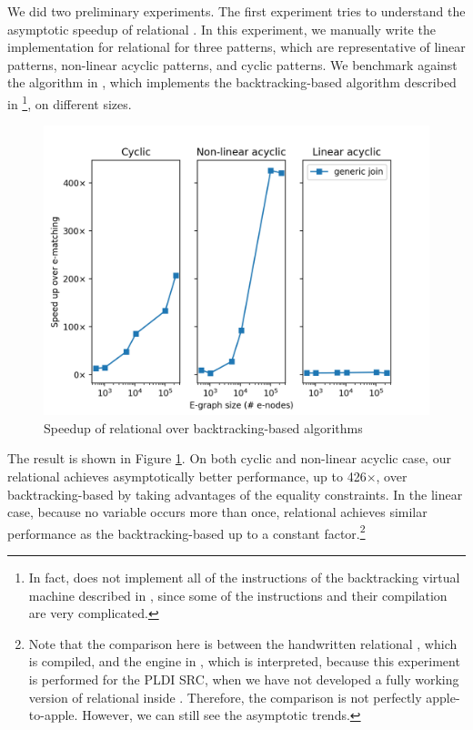 We did two preliminary experiments. The first experiment tries to understand the asymptotic speedup of relational \ematching. In this experiment, we manually write the implementation for relational \ematching for three patterns, which are representative of linear patterns, non-linear acyclic patterns, and cyclic patterns. We benchmark against the \ematching algorithm in \egg, which implements the backtracking-based \ematching algorithm described in \citet{efficient-ematching}\footnote{In fact, \egg does not implement all of the instructions of the backtracking virtual machine described in \citet{efficient-ematching}, since some of the instructions and their compilation are very complicated.}, on different \egraph sizes.

\begin{figure}
    \centering
    \includegraphics[width=\linewidth]{figures/egdb.png}
    \caption{Speedup of relational \ematching over backtracking-based \ematching algorithms}
    \label{fig:bench1}
\end{figure}

The result is shown in Figure \ref{fig:bench1}. On both cyclic and non-linear acyclic case, our relational \ematching achieves asymptotically better performance, up to 426$\times$, over backtracking-based \ematching by taking advantages of the equality constraints. In the linear
case, because no variable occurs more than once, relational \ematching
achieves similar performance as the backtracking-based \ematching up to a constant factor.\footnote{Note that the comparison here is between the handwritten relational \ematching, which is compiled, and the \ematching engine in \egg, which is interpreted, because this experiment is performed for the PLDI SRC, when we have not developed a fully working version of relational \ematching inside \egg. Therefore, the comparison is not perfectly apple-to-apple. However, we can still see the asymptotic trends.}

